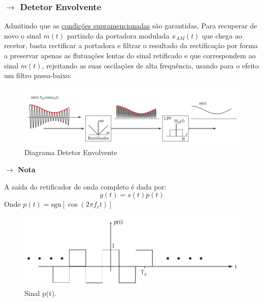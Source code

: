\clearpage
\subsubsection[2.1.2 Detetor Envolvente]{$\rightarrow$ Detetor Envolvente}
\label{subsubsec:DetetorEnvolvente}

Admitindo que as \hyperref[subsubsec:AM-freq-domain]{condições supramencionadas} são garantidas, Para recuperar de novo o sinal $m(t)$ partindo da portadora modulada $x_{AM} (t)$ que chega ao recetor, basta rectificar a portadora e filtrar o resultado da rectificação por forma a preservar apenas as flutuações lentas do sinal retificado e que correspondem ao sinal $m(t)$, rejeitando as suas oscilações de alta frequência, usando para o efeito um filtro passa-baixo:

\begin{figure}[H]
    \centering
    \includegraphics[width = 1\linewidth]{img/analog/AM/detetorEnvolvente.png}
    \caption{Diagrama Detetor Envolvente}
    \label{fig:DetetorEnvolvente}
\end{figure}

\noindent \textbf{$\rightarrow$ Nota}

\noindent A saída do retificador de onda completo é dada por:
$$
    y(t) = s(t) p(t)
$$
Onde $\boxed{p(t) = \text{sgn}[\cos{(2\pi f_c t)}]}$

\begin{figure}[H]
    \centering
    \includegraphics[width = 1\linewidth]{img/analog/AM/pt_envolvente.png}
    \caption{Sinal p(t).}
    \label{fig:p(t)}
\end{figure}

